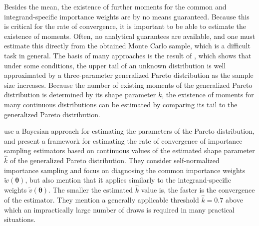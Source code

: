 \documentclass[12pt]{article}
\newcommand{\ome}{v}
\begin{document}
Besides the mean, the existence of further moments for the
common and integrand-specific importance weights are
by no means guaranteed.
Because this is critical for the rate of convergence, it
is important to be able to estimate the existence of moments. Often, no analytical
guarantees are available, and one must estimate this directly from the obtained Monte Carlo sample, which is a difficult task in general.
The basis of many approaches is the result of
\citet{pickands1975statistical}, which shows that under some conditions, the upper tail of an unknown
distribution is well approximated by a three-parameter generalized Pareto distribution
as the sample size increases.
Because the number of existing moments
of the generalized Pareto distribution is determined by its shape parameter $k$, the existence of moments for many continuous distributions can be estimated by comparing its tail to the generalized Pareto distribution.
%
%
%
%




%
%
%
\citet{vehtari2015pareto} use a Bayesian approach
for estimating the parameters of the Pareto distribution, and
present a framework for estimating the rate of convergence of importance sampling estimators
based on continuous values of
the estimated shape parameter $\hat{k}$ of the generalized Pareto distribution.
%
%
%
%
They consider self-normalized importance sampling and focus on
diagnosing the common importance weights
$\widetilde{w} (\boldsymbol{\theta})$, but also mention that
it applies similarly to the integrand-specific weights
$\widetilde{\ome} (\boldsymbol{\theta})$.
The smaller the estimated $\hat{k}$ value is, the faster is the convergence
of the estimator.
They mention a generally applicable threshold $\hat{k} = 0.7$ above which
an impractically large number of draws is required in many
practical situations.
\end{document}
